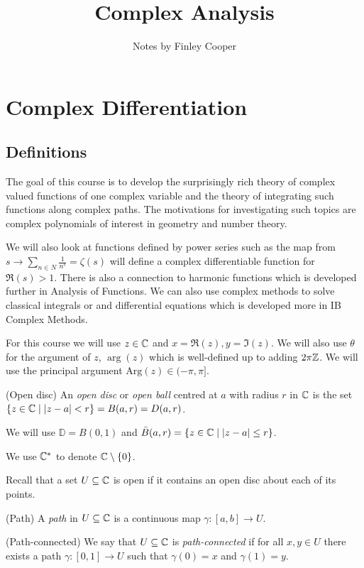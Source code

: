 \documentclass{article}
\title{Complex Analysis}
\author{Notes by Finley Cooper}
\newcommand{\Arg}{\mathrm{Arg}}
\begin{document}
  \maketitle
  \newpage
  \tableofcontents
  \newpage
  \section{Complex Differentiation}
  \subsection{Definitions}
  The goal of this course is to develop the surprisingly rich theory of complex valued functions of one complex variable and the theory of integrating such functions along complex paths. The motivations for investigating such topics are complex polynomials of interest in geometry and number theory.\par
  We will also look at functions defined by power series such as the map from $ s\to \sum_{n\in N}\frac 1{n^s} = \zeta(s) $ will define a complex differentiable function for $ \Re(s)>1 $. There is also a connection to harmonic functions which is developed further in Analysis of Functions. We can also use complex methods to solve classical integrals or and differential equations which is developed more in IB Complex Methods.\par
  For this course we will use $ z\in \mathbb{C} $ and $ x=\Re(z), y=\Im(z) $. We will also use $ \theta $ for the argument of $ z $, $ \arg(z) $ which is well-defined up to adding $ 2\pi \mathbb{Z} $. We will use the principal argument $ \Arg(z)\in(-\pi,\pi] $.
  \begin{definition}
	  (Open disc) An \textit{open disc} or \textit{open ball} centred at $ a $ with radius $ r $ in $ \mathbb{C} $ is the set $ \{z\in \mathbb{C}\mid |z-a|<r\}  = B(a,r)= D(a,r)$.
  \end{definition}
  \begin{remark}
	  We will use $ \mathbb D = B(0,1) $ and $ \bar B(a,r) = \{ z\in \mathbb{C}\mid |z-a|\le r\} $.
  \end{remark}
  We use $ \mathbb{C}^* $ to denote $ \mathbb{C}\setminus \{0\} $.\par
  Recall that a set $ U\subseteq \mathbb{C} $ is open if it contains an open disc about each of its points.
  \begin{definition}
	  (Path) A \textit{path} in $ U\subseteq \mathbb{C} $ is a continuous map $ \gamma:[a,b]\to U $.
  \end{definition}
  \begin{definition}
	  (Path-connected) We say that $ U\subseteq \mathbb{C} $ is \textit{path-connected} if for all $ x,y\in U $ there exists a path $ \gamma:[0,1]\to U $ such that $ \gamma(0) = x $ and $ \gamma(1) = y $.
  \end{definition}
\end{document}

